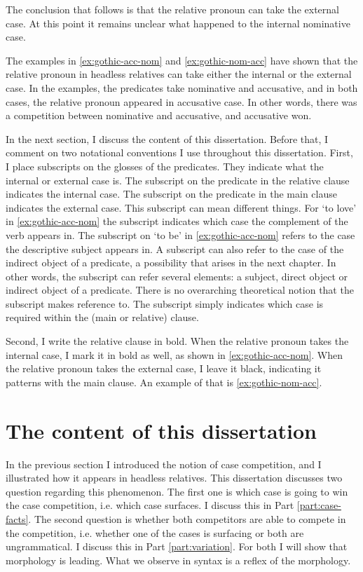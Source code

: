 The conclusion that follows is that the relative pronoun can take the external case. At this point it remains unclear what happened to the internal nominative case.

The examples in \ref{ex:gothic-acc-nom} and \ref{ex:gothic-nom-acc} have shown that the relative pronoun in headless relatives can take either the internal or the external case. In the examples, the predicates take nominative and accusative, and in both cases, the relative pronoun appeared in accusative case. In other words, there was a competition between nominative and accusative, and accusative won.

In the next section, I discuss the content of this dissertation. Before that, I comment on two notational conventions I use throughout this dissertation. First, I place subscripts on the glosses of the predicates. They indicate what the internal or external case is. The subscript on the predicate in the relative clause indicates the internal case. The subscript on the predicate in the main clause indicates the external case. This subscript can mean different things.
For  `to love' in \ref{ex:gothic-acc-nom} the subscript indicates which case the complement of the verb appears in. The subscript on  `to be' in \ref{ex:gothic-acc-nom} refers to the case the descriptive subject appears in. A subscript can also refer to the case of the indirect object of a predicate, a possibility that arises in the next chapter.
In other words, the subscript can refer several elements: a subject, direct object or indirect object of a predicate. There is no overarching theoretical notion that the subscript makes reference to. The subscript simply indicates which case is required within the (main or relative) clause.

Second, I write the relative clause in bold. When the relative pronoun takes the internal case, I mark it in bold as well, as shown in \ref{ex:gothic-acc-nom}. When the relative pronoun takes the external case, I leave it black, indicating it patterns with the main clause. An example of that is \ref{ex:gothic-nom-acc}.


\section{The content of this dissertation}

In the previous section I introduced the notion of case competition, and I illustrated how it appears in headless relatives. This dissertation discusses two question regarding this phenomenon.
The first one is which case is going to win the case competition, i.e. which case surfaces. I discuss this in Part \ref{part:case-facts}.
The second question is whether both competitors are able to compete in the competition, i.e. whether one of the cases is surfacing or both are ungrammatical. I discuss this in Part \ref{part:variation}.
For both I will show that morphology is leading. What we observe in syntax is a reflex of the morphology.


